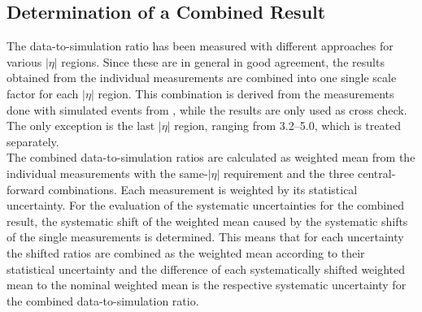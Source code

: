 \subsection{Determination of a Combined Result}
\label{subsec:jer_combination}
The data-to-simulation ratio has been measured with different approaches for various $|\eta|$ regions. Since these are in general in good agreement, the results obtained from the individual measurements are combined into one single scale factor for each $|\eta|$ region. This combination is derived from the measurements done with simulated events from \pythia, while the \herwig results are only used as cross check. The only exception is the last $|\eta|$ region, ranging from 3.2--5.0, which is treated separately. \\
The combined data-to-simulation ratios are calculated as weighted mean from the individual measurements with the same-$|\eta|$ requirement and the three central-forward combinations. Each measurement is weighted by its statistical uncertainty. For the evaluation of the systematic uncertainties for the combined result, the systematic shift of the weighted mean caused by the systematic shifts of the single measurements is determined. This means that for each uncertainty the shifted ratios are combined as the weighted mean according to their statistical uncertainty and the difference of each systematically shifted weighted mean to the nominal weighted mean is the respective systematic uncertainty for the combined data-to-simulation ratio. 
\begin{table}[!p]
\centering
\caption{Measured data-to-simulation ratio in various $|\eta|$ regions with statistical and systematic uncertainty as well as the total uncertainty.}
\label{tab:result}
\end{table} 
